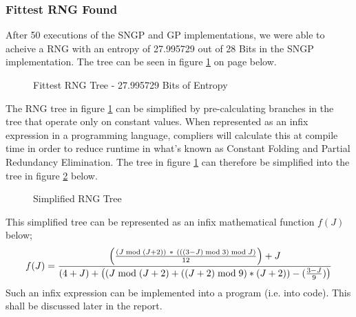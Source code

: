 \documentclass[a4paper,10.5pt]{article}
\begin{document}
\subsubsection{Fittest RNG Found}
After 50 executions of the SNGP and GP implementations, we were able to acheive a RNG with an entropy of 27.995729 out of 28 Bits in the SNGP implementation. The tree can be seen in figure \ref{fulltree} on page \pageref{fulltree} below.


\begin{figure}
\caption{Fittest RNG Tree - 27.995729 Bits  of Entropy}
\label{fulltree}
\end{figure}

The RNG tree in figure \ref{fulltree} can be simplified by pre-calculating branches in the tree that operate only on constant values. When represented as an infix expression in a programming language, compliers will calculate this at compile time in order to reduce runtime in what's known as Constant Folding and Partial Redundancy Elimination. The tree in figure \ref{fulltree} can therefore be simplified into the tree in figure \ref{simplifiedtree} below.

\begin{figure}[H]

\centering
\caption{Simplified RNG Tree}
\label{simplifiedtree}
\end{figure}
This simplified tree can be represented as an infix mathematical function $f(J)$ below;
\begin{equation*}
f(J) = {{\left( (J\bmod (J+2))\ *\ (((3-J)\bmod 3)\bmod J) \over 12 \right) + J} \over {(4 + J) + \left((J\bmod(J+2) + ((J+2)\bmod 9) * (J+2)) - ({3-J \over 9}) \right)}}
\end{equation*}
Such an infix expression can be implemented into a program (i.e. into code). This shall be discussed later in the report.
\end{document}
